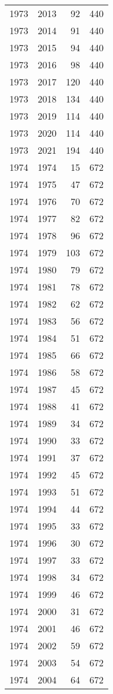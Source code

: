 \documentclass[
  11pt,
  letterpaper,
  DIV=11,
  numbers=noendperiod,
  twoside]{scrartcl}
\begin{document}
\begin{longtable}[]{@{}rrrr@{}}
1973 & 2013 & 92 & 440 \\
1973 & 2014 & 91 & 440 \\
1973 & 2015 & 94 & 440 \\
1973 & 2016 & 98 & 440 \\
1973 & 2017 & 120 & 440 \\
1973 & 2018 & 134 & 440 \\
1973 & 2019 & 114 & 440 \\
1973 & 2020 & 114 & 440 \\
1973 & 2021 & 194 & 440 \\
1974 & 1974 & 15 & 672 \\
1974 & 1975 & 47 & 672 \\
1974 & 1976 & 70 & 672 \\
1974 & 1977 & 82 & 672 \\
1974 & 1978 & 96 & 672 \\
1974 & 1979 & 103 & 672 \\
1974 & 1980 & 79 & 672 \\
1974 & 1981 & 78 & 672 \\
1974 & 1982 & 62 & 672 \\
1974 & 1983 & 56 & 672 \\
1974 & 1984 & 51 & 672 \\
1974 & 1985 & 66 & 672 \\
1974 & 1986 & 58 & 672 \\
1974 & 1987 & 45 & 672 \\
1974 & 1988 & 41 & 672 \\
1974 & 1989 & 34 & 672 \\
1974 & 1990 & 33 & 672 \\
1974 & 1991 & 37 & 672 \\
1974 & 1992 & 45 & 672 \\
1974 & 1993 & 51 & 672 \\
1974 & 1994 & 44 & 672 \\
1974 & 1995 & 33 & 672 \\
1974 & 1996 & 30 & 672 \\
1974 & 1997 & 33 & 672 \\
1974 & 1998 & 34 & 672 \\
1974 & 1999 & 46 & 672 \\
1974 & 2000 & 31 & 672 \\
1974 & 2001 & 46 & 672 \\
1974 & 2002 & 59 & 672 \\
1974 & 2003 & 54 & 672 \\
1974 & 2004 & 64 & 672 \\

\end{longtable}
\end{document}
